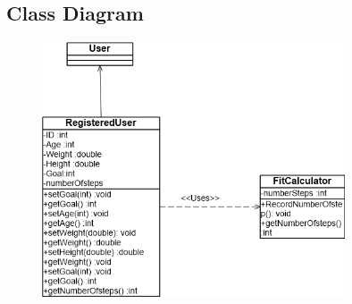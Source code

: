 \subsection{Class Diagram}
\begin{figure}[!htbp]
  \includegraphics[width=0.8\textwidth]{Fitness/FitnessClassDgm.png}
\end{figure}
